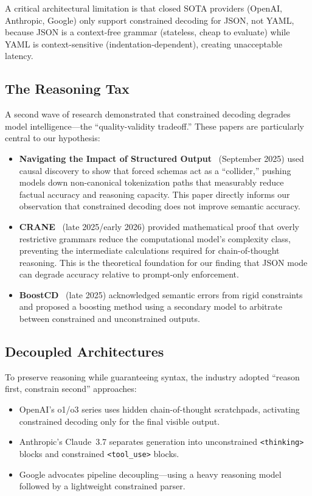 \documentclass[11pt, letterpaper]{article}
\begin{document}
A critical architectural limitation is that closed SOTA providers (OpenAI, Anthropic, Google) only support constrained decoding for JSON, not YAML, because JSON is a context-free grammar (stateless, cheap to evaluate) while YAML is context-sensitive (indentation-dependent), creating unacceptable latency.

\subsection{The Reasoning Tax}
\label{sec:reasoning_tax}

A second wave of research demonstrated that constrained decoding degrades model intelligence---the ``quality-validity tradeoff.'' These papers are particularly central to our hypothesis:

\begin{itemize}[leftmargin=*]
    \item \textbf{Navigating the Impact of Structured Output}~\cite{causal_inference} (September 2025) used causal discovery to show that forced schemas act as a ``collider,'' pushing models down non-canonical tokenization paths that measurably reduce factual accuracy and reasoning capacity. This paper directly informs our observation that constrained decoding does not improve semantic accuracy.
    \item \textbf{CRANE}~\cite{crane} (late 2025/early 2026) provided mathematical proof that overly restrictive grammars reduce the computational model's complexity class, preventing the intermediate calculations required for chain-of-thought reasoning. This is the theoretical foundation for our finding that JSON mode can degrade accuracy relative to prompt-only enforcement.
    \item \textbf{BoostCD}~\cite{boostcd} (late 2025) acknowledged semantic errors from rigid constraints and proposed a boosting method using a secondary model to arbitrate between constrained and unconstrained outputs.
\end{itemize}

\subsection{Decoupled Architectures}
\label{sec:decoupled}

To preserve reasoning while guaranteeing syntax, the industry adopted ``reason first, constrain second'' approaches:

\begin{itemize}[leftmargin=*]
    \item OpenAI's o1/o3 series uses hidden chain-of-thought scratchpads, activating constrained decoding only for the final visible output.
    \item Anthropic's Claude~3.7 separates generation into unconstrained \texttt{<thinking>} blocks and constrained \texttt{<tool\_use>} blocks.
    \item Google advocates pipeline decoupling---using a heavy reasoning model followed by a lightweight constrained parser.
\end{itemize}
\end{document}

